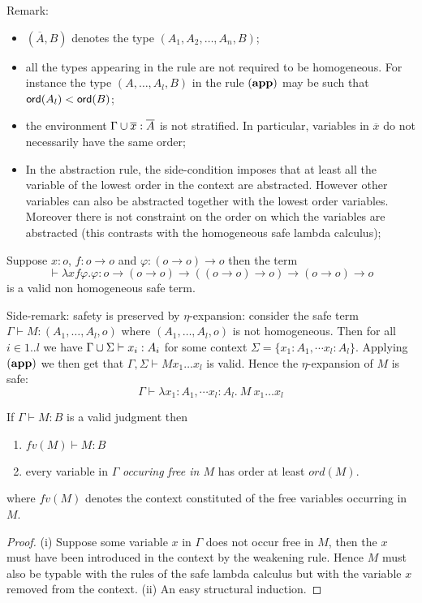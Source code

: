 Remark:
\begin{itemize}
\item $(\overline{A},B)$ denotes the type $(A_1,A_2, \ldots, A_n, B)$;
\item all the types appearing in the rule are not required to be homogeneous. For instance
the type $(A,\ldots,A_l,B)$ in the rule $\mathbf{(app)}$ may be such that ${\sf ord}(A_l) < {\sf ord}(B)$;
\item the environment $\Gamma \cup \overline{x}:\overline{A}$ is not stratified. In particular, variables in $\overline{x}$ do not necessarily have the same order;
\item In the abstraction rule, the side-condition imposes that at least all the variable of the lowest order
in the context are abstracted. However other variables can also be
abstracted together with the lowest order variables. Moreover there
is not constraint on the order on which the variables are abstracted
(this contrasts with the homogeneous safe lambda calculus);
\end{itemize}

\begin{exmp}
Suppose $x:o$, $f:o\rightarrow o$ and $\varphi:(o\rightarrow
o)\rightarrow o$ then the term $$\vdash \lambda x f \varphi .
\varphi : o \rightarrow (o\rightarrow o) \rightarrow ((o\rightarrow
o)\rightarrow o) \rightarrow (o\rightarrow o)\rightarrow o$$ is
a valid non homogeneous safe term.
\end{exmp}

Side-remark: safety is preserved by $\eta$-expansion: consider the safe term
$\Gamma \vdash M:(A_1,\ldots,A_l,o)$ where $(A_1,\ldots,A_l,o)$ is not homogeneous. Then for all $i \in 1..l$ we have $\Gamma \cup \Sigma \vdash x_i :A_i$ for some
context $\Sigma = \{ x_1:A_1, \cdots x_l :A_l \}$. Applying $\mathbf{(app)}$ we then get that $\Gamma, \Sigma \vdash M x_1 \ldots x_l$ is valid. Hence
the $\eta$-expansion of $M$ is safe:
$$\Gamma \vdash \lambda x_1:A_1, \cdots x_l:A_l .\ M\ x_1 \ldots x_l$$


\begin{lem}
\label{lem:nonhomosafe_basic_prop}
If $\Gamma \vdash M : B$ is a valid judgment then
\begin{enumerate}
\item $fv(M) \vdash M : B$
\item every variable in $\Gamma$ \emph{occuring free in $M$} has order at
least $ord(M)$.
\end{enumerate}
where $fv(M)$ denotes the context constituted of the free variables occurring in $M$.
\end{lem}
\begin{proof}
(i) Suppose some variable $x$ in $\Gamma$ does not occur free in $M$,
then the $x$ must have been introduced in the context by the weakening rule.
Hence $M$ must also be typable with the rules of the safe lambda calculus but with the variable $x$ removed from the context.
(ii) An easy structural induction.
\end{proof}

